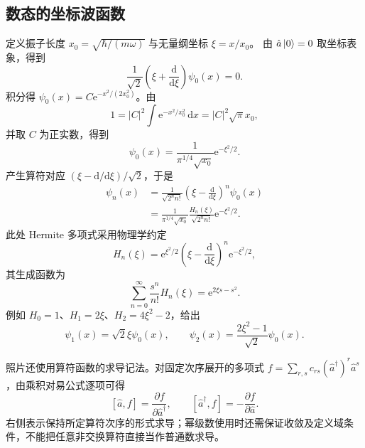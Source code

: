 \subsection{数态的坐标波函数}
定义振子长度 $x_0=\sqrt{\hbar/\left(m\omega\right)}$ 与无量纲坐标 $\xi=x/x_0$。
由 $\hat a\Ket{0}=0$ 取坐标表象，得到
\begin{equation}
\frac{1}{\sqrt2}\left(\xi+\frac{\mathrm{d}}{\mathrm{d}\xi}\right)\psi_0\left(x\right)=0.
\end{equation}
积分得 $\psi_0\left(x\right)=C\mathrm{e}^{-x^2/\left(2x_0^2\right)}$。由
\begin{equation}
1=\left|C\right|^2\int\mathrm{e}^{-x^2/x_0^2}\,\mathrm{d}x
=\left|C\right|^2\sqrt\pi x_0,
\end{equation}
并取 $C$ 为正实数，得到
\begin{equation}
\psi_0\left(x\right)=\frac{1}{\pi^{1/4}\sqrt{x_0}}\mathrm{e}^{-\xi^2/2}.
\end{equation}
产生算符对应 $\left(\xi-\mathrm{d}/\mathrm{d}\xi\right)/\sqrt2$，于是
\begin{align}
\psi_n\left(x\right)&=\frac{1}{\sqrt{2^n n!}}
\left(\xi-\frac{\mathrm{d}}{\mathrm{d}\xi}\right)^n\psi_0\left(x\right)\\
&=\boxed{\frac{1}{\pi^{1/4}\sqrt{x_0}}\frac{H_n\left(\xi\right)}{\sqrt{2^n n!}}
\mathrm{e}^{-\xi^2/2}.}
\label{eq:hermite-wavefunction}
\end{align}
此处 Hermite 多项式采用物理学约定
\begin{equation}
H_n\left(\xi\right)=\mathrm{e}^{\xi^2/2}
\left(\xi-\frac{\mathrm{d}}{\mathrm{d}\xi}\right)^n\mathrm{e}^{-\xi^2/2},
\end{equation}
其生成函数为
\begin{equation}
\sum_{n=0}^{\infty}\frac{s^n}{n!}H_n\left(\xi\right)=\mathrm{e}^{2\xi s-s^2}.
\label{eq:hermite-generating}
\end{equation}
例如 $H_0=1$、$H_1=2\xi$、$H_2=4\xi^2-2$，给出
\begin{equation}
\psi_1\left(x\right)=\sqrt2\xi\psi_0\left(x\right),\qquad
\psi_2\left(x\right)=\frac{2\xi^2-1}{\sqrt2}\psi_0\left(x\right).
\end{equation}

照片还使用算符函数的求导记法。对固定次序展开的多项式
$f=\sum_{r,s}c_{rs}\left(\hat a^\dagger\right)^r\hat a^s$，由乘积对易公式逐项可得
\begin{equation}
\left[\hat a,f\right]=\frac{\partial f}{\partial\hat a^\dagger},\qquad
\left[\hat a^\dagger,f\right]=-\frac{\partial f}{\partial\hat a}.
\end{equation}
右侧表示保持所定算符次序的形式求导；幂级数使用时还需保证收敛及定义域条件，不能把任意非交换算符直接当作普通数求导。
